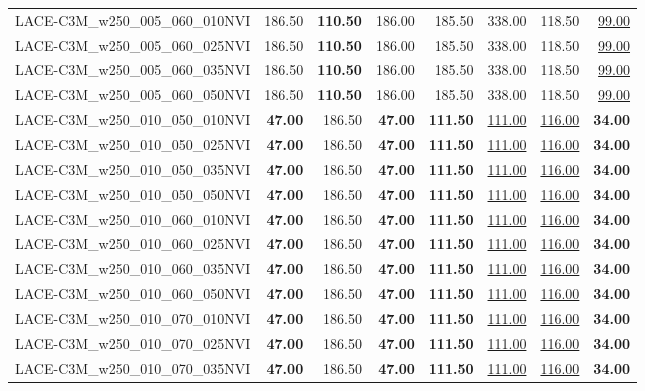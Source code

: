 \begin{table}
\begin{tabular}{lrrrrrrr}
LACE-C3M\_w250\_005\_060\_010NVI & 186.50 & \textbf{110.50} & 186.00 & 185.50 & 338.00 & 118.50 & \underline{99.00} \\
LACE-C3M\_w250\_005\_060\_025NVI & 186.50 & \textbf{110.50} & 186.00 & 185.50 & 338.00 & 118.50 & \underline{99.00} \\
LACE-C3M\_w250\_005\_060\_035NVI & 186.50 & \textbf{110.50} & 186.00 & 185.50 & 338.00 & 118.50 & \underline{99.00} \\
LACE-C3M\_w250\_005\_060\_050NVI & 186.50 & \textbf{110.50} & 186.00 & 185.50 & 338.00 & 118.50 & \underline{99.00} \\
LACE-C3M\_w250\_010\_050\_010NVI & \textbf{47.00} & 186.50 & \textbf{47.00} & \textbf{111.50} & \underline{111.00} & \underline{116.00} & \textbf{34.00} \\
LACE-C3M\_w250\_010\_050\_025NVI & \textbf{47.00} & 186.50 & \textbf{47.00} & \textbf{111.50} & \underline{111.00} & \underline{116.00} & \textbf{34.00} \\
LACE-C3M\_w250\_010\_050\_035NVI & \textbf{47.00} & 186.50 & \textbf{47.00} & \textbf{111.50} & \underline{111.00} & \underline{116.00} & \textbf{34.00} \\
LACE-C3M\_w250\_010\_050\_050NVI & \textbf{47.00} & 186.50 & \textbf{47.00} & \textbf{111.50} & \underline{111.00} & \underline{116.00} & \textbf{34.00} \\
LACE-C3M\_w250\_010\_060\_010NVI & \textbf{47.00} & 186.50 & \textbf{47.00} & \textbf{111.50} & \underline{111.00} & \underline{116.00} & \textbf{34.00} \\
LACE-C3M\_w250\_010\_060\_025NVI & \textbf{47.00} & 186.50 & \textbf{47.00} & \textbf{111.50} & \underline{111.00} & \underline{116.00} & \textbf{34.00} \\
LACE-C3M\_w250\_010\_060\_035NVI & \textbf{47.00} & 186.50 & \textbf{47.00} & \textbf{111.50} & \underline{111.00} & \underline{116.00} & \textbf{34.00} \\
LACE-C3M\_w250\_010\_060\_050NVI & \textbf{47.00} & 186.50 & \textbf{47.00} & \textbf{111.50} & \underline{111.00} & \underline{116.00} & \textbf{34.00} \\
LACE-C3M\_w250\_010\_070\_010NVI & \textbf{47.00} & 186.50 & \textbf{47.00} & \textbf{111.50} & \underline{111.00} & \underline{116.00} & \textbf{34.00} \\
LACE-C3M\_w250\_010\_070\_025NVI & \textbf{47.00} & 186.50 & \textbf{47.00} & \textbf{111.50} & \underline{111.00} & \underline{116.00} & \textbf{34.00} \\
LACE-C3M\_w250\_010\_070\_035NVI & \textbf{47.00} & 186.50 & \textbf{47.00} & \textbf{111.50} & \underline{111.00} & \underline{116.00} & \textbf{34.00} \\

\end{tabular}
\end{table}
